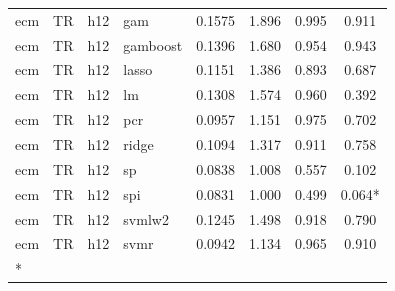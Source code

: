 \begin{ThreePartTable}
\begin{longtable}[t]{llclcccc}
ecm & TR & h12 & gam & 0.1575 & 1.896 & 0.995 & 0.911\\
ecm & TR & h12 & gamboost & 0.1396 & 1.680 & 0.954 & 0.943\\
ecm & TR & h12 & lasso & 0.1151 & 1.386 & 0.893 & 0.687\\
ecm & TR & h12 & lm & 0.1308 & 1.574 & 0.960 & 0.392\\
ecm & TR & h12 & pcr & 0.0957 & 1.151 & 0.975 & 0.702\\
ecm & TR & h12 & ridge & 0.1094 & 1.317 & 0.911 & 0.758\\
ecm & TR & h12 & sp & 0.0838 & 1.008 & 0.557 & 0.102\\
ecm & TR & h12 & spi & 0.0831 & 1.000 & 0.499 & 0.064*\\
ecm & TR & h12 & svmlw2 & 0.1245 & 1.498 & 0.918 & 0.790\\
ecm & TR & h12 & svmr & 0.0942 & 1.134 & 0.965 & 0.910\\*
\end{longtable}
\end{ThreePartTable}
\endgroup{}
